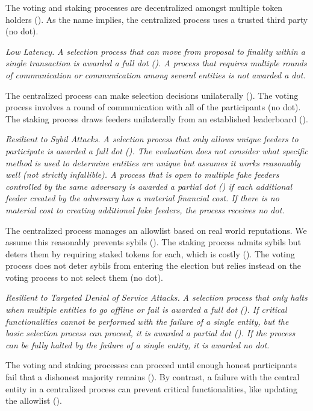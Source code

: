 The voting and staking processes are decentralized amongst multiple token holders (\full). As the name implies, the centralized process uses a trusted third party (no dot).

\emph{Low Latency.} \textit{A selection process that can move from proposal to finality within a single transaction is awarded a full dot (\full). A process that requires multiple rounds of communication or communication among several entities is not awarded a dot.}

The centralized process can make selection decisions unilaterally (\full). The voting process involves a round of communication with all of the participants (no dot). The staking process draws feeders unilaterally from an established leaderboard (\full). 

\emph{Resilient to Sybil Attacks.} \textit{A selection process that only allows unique feeders to participate is awarded a full dot (\full). The evaluation does not consider what specific method is used to determine entities are unique but assumes it works reasonably well (not strictly infallible). A process that is open to multiple fake feeders controlled by the same adversary is awarded a partial dot (\prt) if each additional feeder created by the adversary has a material financial cost. If there is no material cost to creating additional fake feeders, the process receives no dot.}

The centralized process manages an allowlist based on real world reputations. We assume this reasonably prevents sybils (\full). The staking process admits sybils but deters them by requiring staked tokens for each, which is costly (\prt). The voting process does not deter sybils from entering the election but relies instead on the voting process to not select them (no dot).   

\emph{Resilient to Targeted Denial of Service Attacks.} \textit{A selection process that only halts when multiple entities to go offline or fail is awarded a full dot (\full). If critical functionalities cannot be performed with the failure of a single entity, but the basic selection process can proceed, it is awarded a partial dot (\prt). If the process can be fully halted by the failure of a single entity, it is awarded no dot.}

The voting and staking processes can proceed until enough honest participants fail that a dishonest majority remains (\full). By contrast, a failure with the central entity in a centralized process can prevent critical functionalities, like updating the allowlist (\prt).

